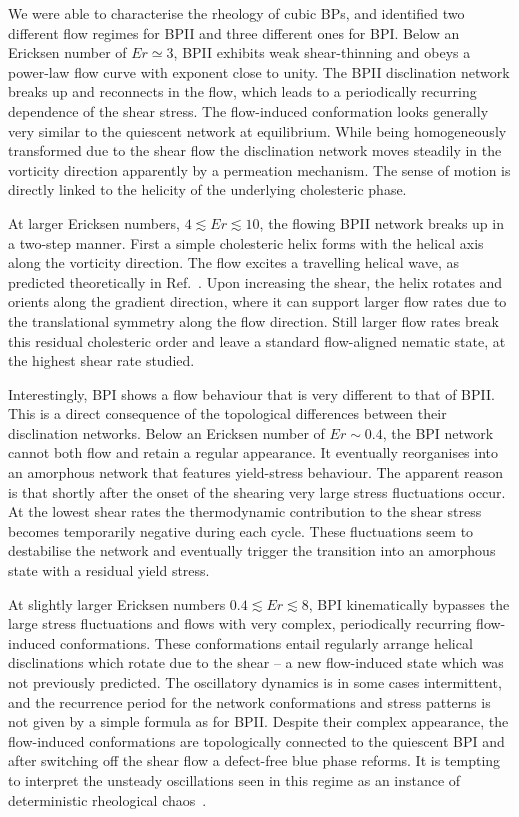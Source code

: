 \documentclass[8.5pt,twoside,twocolumn]{article}
\begin{document}
We were able to characterise the rheology of cubic BPs, and identified 
two different flow regimes for BPII and three different ones for BPI. 
Below an Ericksen number of $Er\simeq3$, BPII exhibits weak shear-thinning and 
obeys a power-law flow curve with exponent close to unity.  
The BPII disclination network breaks up and reconnects 
in the flow, which leads to a periodically recurring dependence 
of the shear stress. The flow-induced conformation looks generally
very similar to the quiescent network at equilibrium. 
While being homogeneously transformed due to the shear flow
the disclination network moves steadily in the vorticity direction
apparently by a permeation mechanism. The sense of
motion is directly linked to the helicity of the underlying cholesteric phase.

At larger Ericksen numbers, $4\lesssim Er\lesssim 10$, the flowing BPII network 
breaks up in a two-step manner. First a simple cholesteric helix forms with the helical axis 
along the vorticity direction. The flow excites a travelling helical wave,
as predicted theoretically in Ref.~\cite{Rey:1996a,Rey:1996b}.
Upon increasing the shear, the helix rotates and orients along the
gradient direction, where it can support larger flow rates due to the translational
symmetry along the flow direction. Still larger flow rates break this residual
cholesteric order and leave a standard flow-aligned nematic state,
at the highest shear rate studied.

Interestingly, BPI shows a flow behaviour that is very different to that of BPII.
This is a direct consequence of the topological differences between their disclination 
networks. Below an Ericksen number of $Er\sim 0.4$, the BPI network cannot both flow and 
retain a regular appearance. It eventually reorganises into an amorphous network that
features yield-stress behaviour. The apparent reason is that shortly after the onset of the shearing 
very large stress fluctuations occur. At the lowest shear rates
the thermodynamic contribution to the shear stress becomes temporarily 
negative during each cycle. These fluctuations seem to destabilise the network and 
eventually trigger the transition into an amorphous state with a residual yield
stress. 

At slightly larger Ericksen numbers $0.4\lesssim Er \lesssim8$,
BPI kinematically bypasses the large stress fluctuations and 
flows with very complex, periodically recurring flow-induced conformations.
These conformations entail regularly arrange helical disclinations which 
rotate due to the shear -- a new flow-induced state which was not previously
predicted. 
The oscillatory dynamics is in some cases intermittent, and the
recurrence period for the network conformations and stress patterns
is not given by a simple formula as for BPII.
Despite their complex appearance, the flow-induced conformations are 
topologically connected to the quiescent BPI and after switching off the 
shear flow a defect-free blue phase reforms. It is tempting to
interpret the unsteady oscillations seen in this regime as an instance of 
deterministic rheological chaos~\cite{fielding, Cates:2002}.
\end{document}
